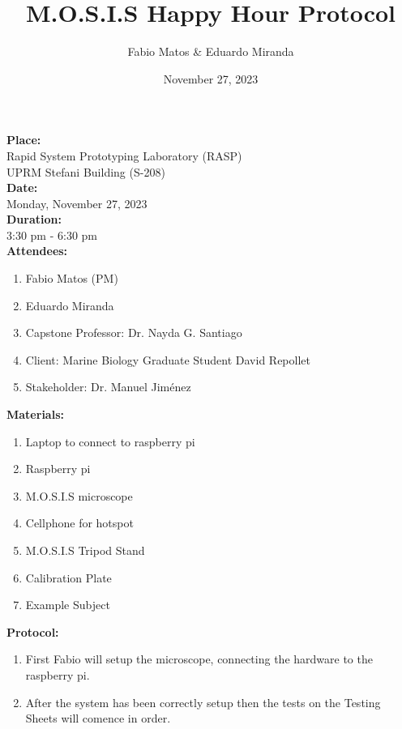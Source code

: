 \documentclass[12pt]{article}
\title{M.O.S.I.S Happy Hour Protocol}
\author{Fabio Matos \& Eduardo Miranda}
\date{November 27, 2023}
\begin{document}
\maketitle
\noindent
\textbf{Place:} \\
Rapid System Prototyping Laboratory (RASP)\\ UPRM Stefani Building (S-208)\\
\textbf{Date:}\\
Monday, November 27, 2023\\
\textbf{Duration:}\\
3:30 pm - 6:30 pm \\
\textbf{Attendees:}
\begin{enumerate}
    \item Fabio Matos (PM)
    \item Eduardo Miranda
    \item Capstone Professor: Dr. Nayda G. Santiago
    \item Client: Marine Biology Graduate Student David Repollet
    \item Stakeholder: Dr. Manuel Jiménez
\end{enumerate}
\textbf{Materials:}
\begin{enumerate}
    \item Laptop to connect to raspberry pi
    \item Raspberry pi
    \item M.O.S.I.S microscope
    \item Cellphone for hotspot
    \item M.O.S.I.S Tripod Stand
    \item Calibration Plate
    \item Example Subject
\end{enumerate}

\textbf{Protocol:}
\begin{enumerate}
    \item First Fabio will setup the microscope, connecting the hardware to the raspberry pi.
    \item After the system has been correctly setup then the tests on the Testing Sheets will comence in order.
\end{enumerate}
\end{document}
